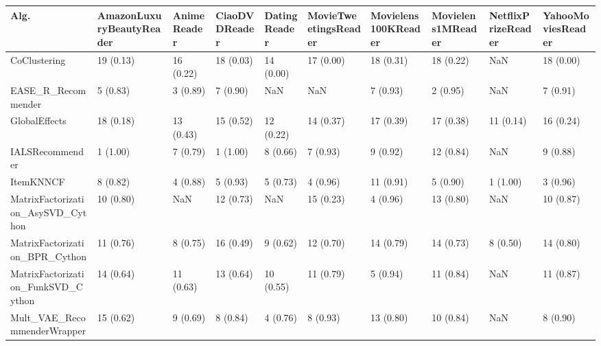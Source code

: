 \begin{tabular}{llllllllll}
\toprule
                               Alg. & AmazonLuxuryBeautyReader & AnimeReader & CiaoDVDReader & DatingReader & MovieTweetingsReader & Movielens100KReader & Movielens1MReader & NetflixPrizeReader & YahooMoviesReader \\
\midrule
                       CoClustering &                19 (0.13) &   16 (0.22) &     18 (0.03) &    14 (0.00) &            17 (0.00) &           18 (0.31) &         18 (0.22) &                NaN &         18 (0.00) \\
                 EASE\_R\_Recommender &                 5 (0.83) &    3 (0.89) &      7 (0.90) &          NaN &                  NaN &            7 (0.93) &          2 (0.95) &                NaN &          7 (0.91) \\
                      GlobalEffects &                18 (0.18) &   13 (0.43) &     15 (0.52) &    12 (0.22) &            14 (0.37) &           17 (0.39) &         17 (0.38) &          11 (0.14) &         16 (0.24) \\
                    IALSRecommender &                 1 (1.00) &    7 (0.79) &      1 (1.00) &     8 (0.66) &             7 (0.93) &            9 (0.92) &         12 (0.84) &                NaN &          9 (0.88) \\
                          ItemKNNCF &                 8 (0.82) &    4 (0.88) &      5 (0.93) &     5 (0.73) &             4 (0.96) &           11 (0.91) &          5 (0.90) &           1 (1.00) &          3 (0.96) \\
  MatrixFactorization\_AsySVD\_Cython &                10 (0.80) &         NaN &     12 (0.73) &          NaN &            15 (0.23) &            4 (0.96) &         13 (0.80) &                NaN &         10 (0.87) \\
     MatrixFactorization\_BPR\_Cython &                11 (0.76) &    8 (0.75) &     16 (0.49) &     9 (0.62) &            12 (0.70) &           14 (0.79) &         14 (0.73) &           8 (0.50) &         14 (0.80) \\
 MatrixFactorization\_FunkSVD\_Cython &                14 (0.64) &   11 (0.63) &     13 (0.64) &    10 (0.55) &            11 (0.79) &            5 (0.94) &         11 (0.84) &                NaN &         11 (0.87) \\
        Mult\_VAE\_RecommenderWrapper &                15 (0.62) &    9 (0.69) &      8 (0.84) &     4 (0.76) &             8 (0.93) &           13 (0.80) &         10 (0.84) &                NaN &          8 (0.90) \\

\end{tabular}
